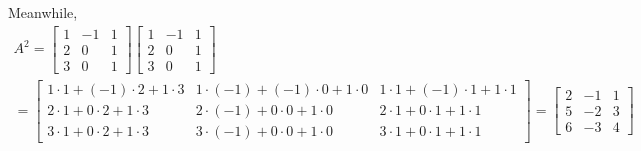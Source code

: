 \documentclass[a4paper, 11pt]{article}
\begin{document}
\begin{solution}
    Meanwhile,
    \begin{multline*}
        A^2 = \left[\begin{array}{ccc}
                1 & -1 & 1 \\
                2 & 0  & 1 \\
                3 & 0  & 1
            \end{array}\right]\left[\begin{array}{ccc}
                1 & -1 & 1 \\
                2 & 0  & 1 \\
                3 & 0  & 1
            \end{array}\right]
        \\
        = \left[\begin{array}{ccc}
                1 \cdot 1 + (-1) \cdot 2 + 1 \cdot 3 & 1 \cdot (-1) + (-1) \cdot 0 + 1 \cdot 0 & 1 \cdot 1 + (-1) \cdot 1 + 1 \cdot 1 \\
                2 \cdot 1 + 0 \cdot 2 + 1 \cdot 3    & 2 \cdot (-1) + 0 \cdot 0 + 1 \cdot 0    & 2 \cdot 1 + 0 \cdot 1 + 1 \cdot 1    \\
                3 \cdot 1 + 0 \cdot 2 + 1 \cdot 3    & 3 \cdot (-1) + 0 \cdot 0 + 1 \cdot 0    & 3 \cdot 1 + 0 \cdot 1 + 1 \cdot 1
            \end{array}\right]
        = \left[\begin{array}{ccc}
                2 & -1 & 1 \\
                5 & -2 & 3 \\
                6 & -3 & 4
            \end{array}\right]
    \end{multline*}


\end{solution}
\end{document}
